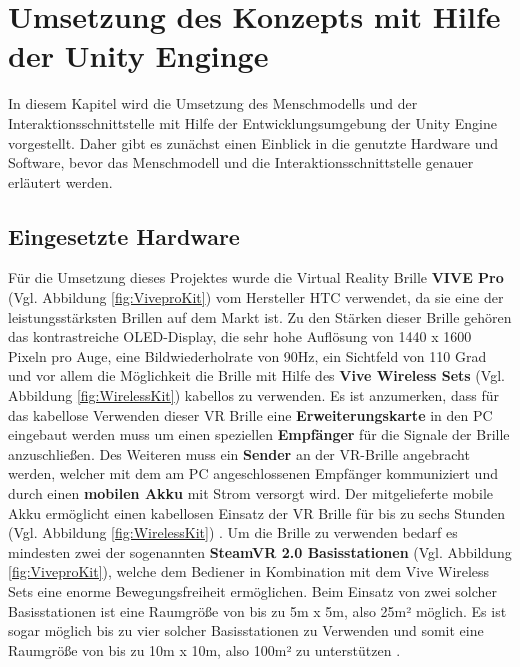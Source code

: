 \chapter{Umsetzung des Konzepts mit Hilfe der Unity Enginge}\label{cha:Umsetzung}
In diesem Kapitel wird die Umsetzung des Menschmodells und der Interaktionsschnittstelle mit Hilfe der Entwicklungsumgebung der Unity Engine vorgestellt. Daher gibt es zunächst einen Einblick in die genutzte Hardware und Software, bevor das Menschmodell und die Interaktionsschnittstelle genauer erläutert werden.
\section{Eingesetzte Hardware}\label{sec:Hardware}
Für die Umsetzung dieses Projektes wurde die Virtual Reality Brille \textbf{VIVE Pro} (Vgl. Abbildung \ref{fig:ViveproKit}) vom Hersteller HTC verwendet, da sie eine der leistungsstärksten Brillen auf dem Markt ist. Zu den Stärken dieser Brille gehören das kontrastreiche OLED-Display, die sehr hohe Auflösung von 1440 x 1600 Pixeln pro Auge, eine Bildwiederholrate von 90Hz, ein Sichtfeld von 110 Grad und vor allem die Möglichkeit die Brille mit Hilfe des \textbf{Vive Wireless Sets} (Vgl. Abbildung \ref{fig:WirelessKit}) kabellos zu verwenden. Es ist anzumerken, dass für das kabellose Verwenden dieser VR Brille eine \textbf{Erweiterungskarte} in den PC eingebaut werden muss um einen speziellen \textbf{Empfänger} für die Signale der Brille anzuschließen. Des Weiteren muss ein \textbf{Sender} an der VR-Brille angebracht werden, welcher mit dem am PC angeschlossenen Empfänger kommuniziert und durch einen \textbf{mobilen Akku} mit Strom versorgt wird. Der mitgelieferte mobile Akku ermöglicht einen kabellosen Einsatz der VR Brille für bis zu sechs Stunden (Vgl. Abbildung \ref{fig:WirelessKit}) \cite{28}.
\newline\newline
Um die Brille zu verwenden bedarf es mindesten zwei der sogenannten \textbf{SteamVR 2.0 Basisstationen} (Vgl. Abbildung \ref{fig:ViveproKit}), welche dem Bediener in Kombination mit dem Vive Wireless Sets eine enorme Bewegungsfreiheit ermöglichen. Beim Einsatz von zwei solcher Basisstationen ist eine Raumgröße von bis zu 5m x 5m, also 25m² möglich. Es ist sogar möglich bis zu vier solcher Basisstationen zu Verwenden und somit eine Raumgröße von bis zu 10m x 10m, also 100m² zu unterstützen \cite{28}.
